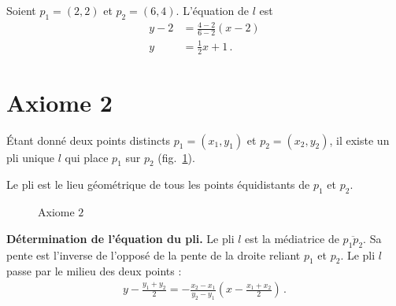 \begin{example}
Soient  $p_1=(2,2)$ et $p_2=(6,4)$. L'équation de $l$ est 
\begin{align*}
y-2&=\frac{4-2}{6-2}(x-2)\\
y&=\frac{1}{2}x+1\,.
\end{align*}
\end{example}



\section{Axiome 2}\label{s.ax2}



\begin{axiom}
Étant donné deux points distincts $p_1=(x_1,y_1)$ et  $p_2=(x_2,y_2)$, il existe un pli unique $l$ qui place $p_1$ sur $p_2$ (fig.~\ref{f.origami-axiom2}).
\end{axiom}

Le pli est le lieu géométrique de tous les points équidistants de $p_1$ et $p_2$.\\

\begin{figure}[ht]
\centering
{}
\caption{Axiome  $2$}\label{f.origami-axiom2}
\end{figure}

\noindent\textbf{Détermination de l'équation du pli.}
Le pli $l$ est la médiatrice de $\overline{p_1p_2}$. Sa pente est l'inverse de l'opposé de la pente de la droite reliant $p_1$ et $p_2$. Le pli $l$ passe par le milieu des deux points :
\begin{align}
y - \frac{y_1+y_2}{2} = -\frac{x_2-x_1}{y_2-y_1}\left(x-\frac{x_1+x_2}{2}\right)\,.\label{eq.midpoint1}
\end{align}

